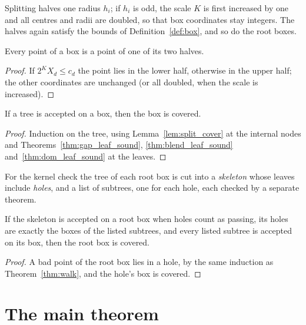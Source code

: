 Splitting halves one radius $h_i$; if $h_i$ is odd, the scale $K$ is first increased by one
and all centres and radii are doubled, so that box coordinates stay integers. The halves
again satisfy the bounds of Definition~\ref{def:box}, and so do the root boxes.

\begin{lemma}
\label{lem:split_cover}
\leanok
{}
Every point of a box is a point of one of its two halves.
\end{lemma}
\begin{proof}
\leanok
If $2^K X_d \le c_d$ the point lies in the lower half, otherwise in the upper half; the
other coordinates are unchanged (or all doubled, when the scale is increased).
\end{proof}

\begin{theorem}
\label{thm:walk}
\leanok
{}
If a tree is accepted on a box, then the box is covered.
\end{theorem}
\begin{proof}
\leanok
Induction on the tree, using Lemma~\ref{lem:split_cover} at the internal nodes and
Theorems~\ref{thm:gap_leaf_sound}, \ref{thm:blend_leaf_sound} and~\ref{thm:dom_leaf_sound}
at the leaves.
\end{proof}

For the kernel check the tree of each root box is cut into a \emph{skeleton} whose
leaves include \emph{holes}, and a list of subtrees, one for each hole, each checked by a
separate theorem.

\begin{lemma}
\label{lem:root_covered}
\leanok
{}
If the skeleton is accepted on a root box when holes count as passing, its holes are
exactly the boxes of the listed subtrees, and every listed subtree is accepted on its
box, then the root box is covered.
\end{lemma}
\begin{proof}
\leanok
A bad point of the root box lies in a hole, by the same induction as
Theorem~\ref{thm:walk}, and the hole's box is covered.
\end{proof}

\section{The main theorem}


